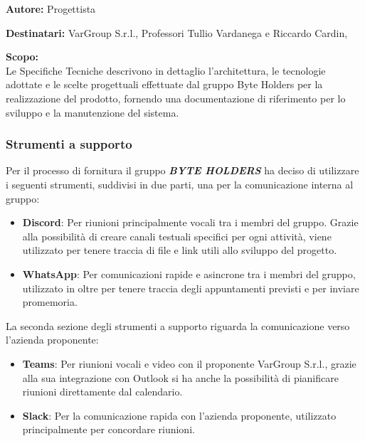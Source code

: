 \documentclass[a4paper, 11pt]{article}
\begin{document}
\begin{tcolorbox}[
    colback=LightGray,
    colframe=AccentColor,
    coltitle=white,
    fonttitle=\bfseries\large,
    boxrule=0.5mm,
    arc=2mm,
    title={Specifiche Tecniche}
]
    \textbf{\textcolor{AccentDark}{Autore:}} Progettista

    \vspace{0.2cm}
    \textbf{\textcolor{AccentDark}{Destinatari:}} VarGroup S.r.l., Professori Tullio Vardanega e Riccardo Cardin, 

    \vspace{0.2cm}
    \textbf{\textcolor{AccentDark}{Scopo:}} \\
    Le Specifiche Tecniche descrivono in dettaglio l'architettura, le tecnologie adottate e le scelte progettuali effettuate dal gruppo Byte Holders per la realizzazione del prodotto, fornendo una documentazione di riferimento per lo sviluppo e la manutenzione del sistema.
\end{tcolorbox}






\subsubsection{Strumenti a supporto}
Per il processo di fornitura il gruppo \textbf{\textit{BYTE HOLDERS}} ha deciso di utilizzare i seguenti strumenti, suddivisi in due parti, una per la comunicazione interna al gruppo:
\begin{itemize}
  \item \textbf{Discord}: Per riunioni principalmente vocali tra i membri del gruppo. Grazie alla possibilità di creare canali testuali specifici per ogni attività, viene utilizzato per tenere traccia di file e link utili allo sviluppo del progetto.
  \item \textbf{WhatsApp}: Per comunicazioni rapide e asincrone tra i membri del gruppo, utilizzato in oltre per tenere traccia degli appuntamenti previsti e per inviare promemoria.
\end{itemize}

La seconda sezione degli strumenti a supporto riguarda la comunicazione verso l'azienda proponente:

\begin{itemize}
  \item \textbf{Teams}: Per riunioni vocali e video con il proponente VarGroup S.r.l., grazie alla sua integrazione con Outlook si ha anche la possibilità di pianificare riunioni direttamente dal calendario.
  \item \textbf{Slack}: Per la comunicazione rapida con l'azienda proponente, utilizzato principalmente per concordare riunioni.
\end{itemize}
\end{document}

